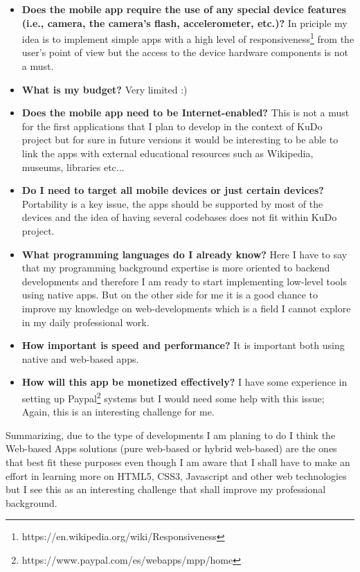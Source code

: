 \documentclass[a4paper,12pt]{book}
\begin{document}
\begin{itemize}
 \item \textbf{Does the mobile app require the use of any special device features (i.e., camera, the camera’s flash, accelerometer, etc.)?} In priciple my idea is to implement simple apps with a high level of responsiveness\footnote{https://en.wikipedia.org/wiki/Responsiveness}  from the user's point of view but the access to the device hardware components is not a must.
 \item \textbf{What is my budget?} Very limited :)
 \item \textbf{Does the mobile app need to be Internet-enabled?} This is not a must for the first applications that I plan to develop in the context of KuDo project but for sure in future versions it would be interesting to be able to link the apps with external educational resources such as Wikipedia, museums, libraries etc...
 \item \textbf{Do I need to target all mobile devices or just certain devices?} Portability is a key issue, the apps should be supported by most of the devices and the idea of having several codebases does not fit within KuDo project.
 \item \textbf{What programming languages do I already know?} Here I have to say that my programming background expertise is more oriented to backend developments and therefore I am ready to start implementing low-level tools using native apps. But on the other side for me it is a good chance to improve my knowledge on web-developments which is a field I cannot explore in my daily professional work.
 \item \textbf{How important is speed and performance?} It is important both using native and web-based apps.
 \item \textbf{How will this app be monetized effectively?} I have some experience in setting up Paypal\footnote{https://www.paypal.com/es/webapps/mpp/home}  systems but I would need some help with this issue; Again, this is an interesting challenge for me.
\end{itemize}

Summarizing, due to the type of developments I am planing to do I think the Web-based Apps solutions (pure web-based or hybrid web-based) are the ones that best fit these purposes even though I am aware that I shall have to make an effort in learning more on HTML5, CSS3, Javascript and other web technologies but I see this as an interesting challenge that shall improve my professional background.
\end{document}
